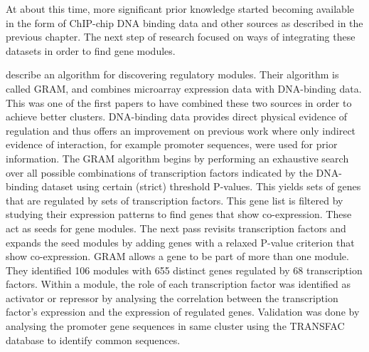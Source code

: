 At about this time, more significant prior knowledge started becoming available in the form of ChIP-chip DNA binding data and other sources as described in the previous chapter. The next step of research focused on ways of integrating these datasets in order to find gene modules. 

\citet{barjoseph03computational} describe an algorithm for discovering regulatory modules. Their algorithm is called \ac{GRAM}, and combines microarray expression data with DNA-binding data. This was one of the first papers to have combined these two sources in order to achieve better clusters. DNA-binding data provides direct physical evidence of regulation and thus offers an improvement on previous work where only indirect evidence of interaction, for example promoter sequences, were used for prior information. The GRAM algorithm begins by performing an exhaustive search over all possible combinations of transcription factors indicated by the DNA-binding dataset using certain (strict) threshold P-values. This yields sets of genes that are regulated by sets of transcription factors. This gene list is filtered by studying their expression patterns to find genes that show co-expression. These act as seeds for gene modules. The next pass revisits transcription factors and expands the seed modules by adding genes with a relaxed P-value criterion that show co-expression. GRAM allows a gene to be part of more than one module. They identified 106 modules with 655 distinct genes regulated by 68 transcription factors. Within a module, the role of each transcription factor was identified as activator or repressor by analysing the correlation between the transcription factor's expression and the expression of regulated genes. Validation was done by analysing the promoter gene sequences in same cluster using the TRANSFAC \citep{transfac1996} database to identify common sequences. 

